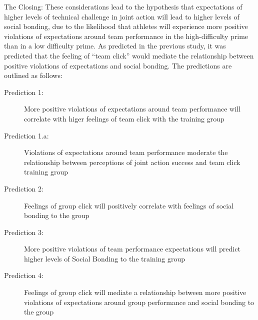



The Closing:
These considerations lead to the hypothesis that expectations of higher levels of technical challenge in joint action will lead to higher levels of social bonding, due to the likelihood that athletes will experience more positive violations of expectations around team performance in the high-difficulty prime than in a low difficulty prime.  As predicted in the previous study, it was predicted that the feeling of ``team click'' would mediate the relationship between positive violations of expectations and social bonding.  The predictions are outlined as follows:
\begin{description}
\item[Prediction 1:] More positive violations of expectations around team performance will correlate with higer feelings of team click with the training group
\item[Prediction 1.a:] Violations of expectations around team performance moderate the relationship between perceptions of joint action success and team click training group
\item[Prediction 2:] Feelings of group click will positively correlate with feelings of social bonding to the group
\item[Prediction 3:] More positive violations of team performance expectations will predict higher levels of Social Bonding to the training group
\item[Prediction 4:] Feelings of group click will mediate a relationship between more positive violations of expectations around group performance and social bonding to the group
\end{description}


